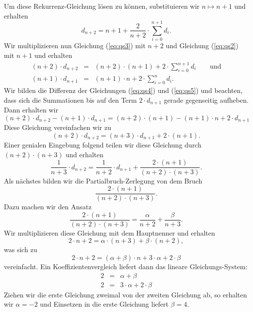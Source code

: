 Um diese Rekurrenz-Gleichung l\"osen zu k\"onnen, substituieren wir $n \mapsto n+1$ und erhalten
\begin{equation}
  \label{eq:qs3}
   d_{n+2} = n+1 + \frac{2}{n+2} \cdot \sum_{i=0}^{n+1} d_i.  
\end{equation}
Wir multiplizieren nun Gleichung (\ref{eq:qs3}) mit $n+2$ und Gleichung (\ref{eq:qs2}) mit $n+1$ und
erhalten 
\begin{eqnarray}
  \label{eq:qs4}
 (n+2)\cdot d_{n+2} & = & (n+2)\cdot(n+1) + 2 \cdot \sum_{i=0}^{n+1} d_i \qquad \mbox{und} \\
  \label{eq:qs5}
 (n+1)\cdot d_{n+1} & = & (n+1)\cdot n + 2 \cdot \sum_{i=0}^n d_i.  
\end{eqnarray}
Wir bilden die Differenz der Gleichungen (\ref{eq:qs4}) und (\ref{eq:qs5}) und beachten,
dass sich die Summationen bis auf den Term $2\cdot d_{n+1}$ gerade gegenseitig aufheben.
Dann erhalten wir
\begin{equation}
  \label{eq:qs6}
 (n+2)\cdot d_{n+2} - (n+1)\cdot \displaystyle d_{n+1} = (n+2)\cdot(n+1) - (n+1)\cdot n+2 \cdot d_{n+1}
\end{equation}
Diese Gleichung vereinfachen wir zu
\begin{equation}
  \label{eq:qs7}
(n+2)\cdot d_{n+2} = (n+3)\cdot \displaystyle d_{n+1} + 2\cdot(n+1).  
\end{equation}
Einer genialen Eingebung folgend teilen wir diese Gleichung durch $(n+2) \cdot(n+3)$ und
erhalten 
\begin{equation}
  \label{eq:qs8}
 \frac{1}{n+3} \cdot d_{n+2} = \frac{1}{n+2}\cdot d_{n+1} + \frac{2\cdot(n+1)}{(n+2)\cdot(n+3)}.
\end{equation}
Als n\"achstes bilden wir die Partialbruch-Zerlegung von dem Bruch
\[ \frac{2\cdot(n+1)}{(n+2)\cdot(n+3)}. \] 
Dazu machen wir den Ansatz
\[ \frac{2\cdot(n+1)}{(n+2)\cdot(n+3)} = \frac{\alpha}{n+2} + \frac{\beta}{n+3}.\]
Wir multiplizieren diese Gleichung mit dem Hauptnenner und erhalten
\[ 2\cdot n + 2 = \alpha \cdot (n+3) + \beta \cdot (n+2), \]
was sich zu 
\[ 2\cdot n + 2 = (\alpha + \beta) \cdot n + 3 \cdot \alpha  + 2 \cdot \beta \]
vereinfacht.  Ein Koeffizientenvergleich liefert dann das lineare Gleichungs-System:
\begin{eqnarray*}
  2 & = & \alpha + \beta \\
  2 & = & 3 \cdot \alpha + 2 \cdot \beta 
\end{eqnarray*}
Ziehen wir die erste Gleichung zweimal von der zweiten Gleichung ab, so erhalten wir
 $\alpha = -2$ und Einsetzen in die erste Gleichung liefert $\beta = 4$.
